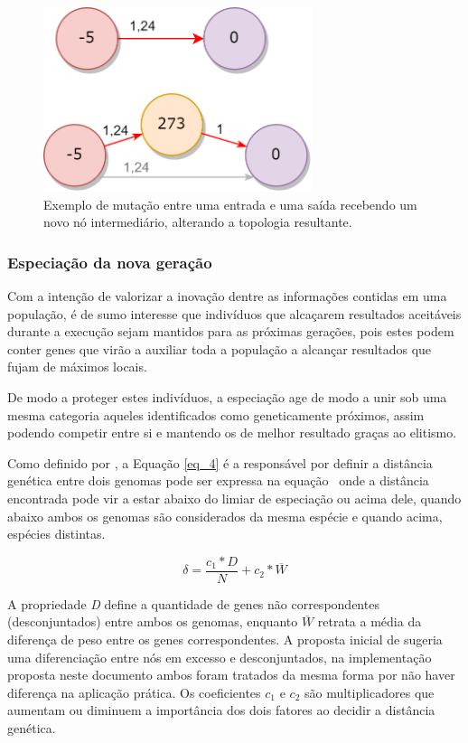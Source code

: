 \begin{figure}[htb]
        \centering
        \caption{\label{fig_MC}Exemplo de mutação entre uma entrada e uma saída recebendo um novo nó intermediário, alterando a topologia resultante.}
        \includegraphics[width=0.7\textwidth]{images/MC.png}
\end{figure}

\subsubsection{Especiação da nova geração}
Com a intenção de valorizar a inovação dentre as informações contidas em uma população, é de sumo interesse
que indivíduos que alcaçarem resultados aceitáveis durante a execução sejam mantidos para as próximas gerações,
pois estes podem conter genes que virão a auxiliar toda a população a alcançar resultados que fujam de máximos locais.

De modo a proteger estes indivíduos, a especiação age de modo a unir sob uma mesma categoria aqueles
identificados como geneticamente próximos, assim podendo competir entre si e mantendo os de melhor resultado graças ao elitismo.

Como definido por , a Equação \ref{eq_4} é a responsável por definir a
distância genética entre dois genomas pode ser expressa na equação \, onde a distância  encontrada
pode vir a estar abaixo do limiar de especiação ou acima dele, quando abaixo ambos os genomas
são considerados da mesma espécie e quando acima, espécies distintas.

\begin{equation}
\label{eq_4}
\delta = \frac{c_1 * D}{N} + c_2 * \overline{W}
\end{equation}

A propriedade \textit{D} define a quantidade de genes não correspondentes
(desconjuntados) entre ambos os genomas, enquanto $\overline{W}$ retrata
a média da diferença de peso entre os genes correspondentes. A proposta inicial
de  sugeria uma diferenciação entre nós em excesso e
desconjuntados, na implementação proposta neste documento ambos foram tratados da
mesma forma por não haver diferença na aplicação prática. Os coeficientes $c_1$
e $c_2$ são multiplicadores que aumentam ou diminuem a importância dos dois fatores
ao decidir a distância genética.

